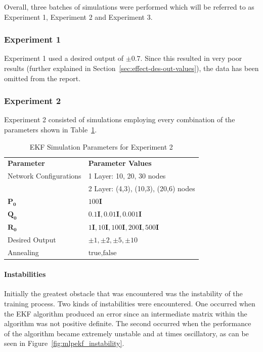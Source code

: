 \documentclass[11pt,letterpaper,titlepage]{article}
\numberwithin{equation}{section}
\numberwithin{figure}{section}
\numberwithin{table}{section}
\begin{document}
Overall, three batches of simulations were performed which will be referred to as Experiment 1, Experiment 2 and Experiment 3. 

\subsubsection{Experiment 1}
Experiment 1 used a desired output of \(\pm0.7\). Since this resulted in very poor results (further explained in Section~\ref{sec:effect-des-out-values}), the data has been omitted from the report. 

\subsubsection{Experiment 2}
Experiment 2 consisted of simulations employing every combination of the parameters shown in Table~\ref{table:ekf_parameters_exp_2}.

\begin{table}[ht]
  	\centering
  	\begin{tabular}{ l l }
		\rowcolor[gray]{0.8}
		\textbf{Parameter} & \textbf{Parameter Values} \\
		Network Configurations & 1 Layer: 10, 20, 30 nodes \\ 
		& 2 Layer: (4,3), (10,3), (20,6) nodes \\
  		\(\mathbf{P_0}\) & \( 100\mathbf{I} \) \\
  		\(\mathbf{Q_0}\) & \( 0.1\mathbf{I}, 0.01\mathbf{I}, 0.001\mathbf{I} \) \\
 		\(\mathbf{R_0}\) & \( 1\mathbf{I}, 10\mathbf{I}, 100\mathbf{I}, 200\mathbf{I}, 500\mathbf{I}\) \\
  		Desired Output& \( \pm1, \pm2, \pm5, \pm10 \) \\
  		Annealing& \( \text{true}, \text{false} \)
	\end{tabular}
	\caption{EKF Simulation Parameters for Experiment 2}
	\label{table:ekf_parameters_exp_2}
\end{table}

\paragraph{Instabilities}
\label{sec:instabilities}

Initially the greatest obstacle that was encountered was the instability of the training process. Two kinds of instabilities were encountered. One occurred when the EKF algorithm produced an error since an intermediate matrix within the algorithm was not positive definite. The second occurred when the performance of the algorithm became extremely unstable and at times oscillatory, as can be seen in Figure~\ref{fig:mlpekf_instability}.
\end{document}
